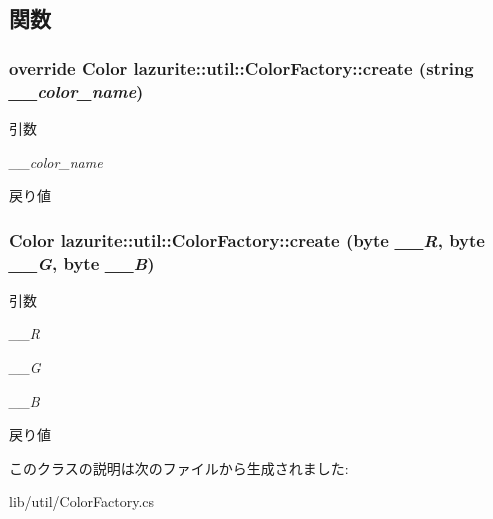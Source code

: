 \subsection{関数}
\hypertarget{classlazurite_1_1util_1_1_color_factory_a6c8331420df5f3442b357ab5c8f0ec99}{
\subsubsection[{create}]{\setlength{\rightskip}{0pt plus 5cm}override Color lazurite::util::ColorFactory::create (string {\em \_\-\_\-color\_\-name})}}
\label{classlazurite_1_1util_1_1_color_factory_a6c8331420df5f3442b357ab5c8f0ec99}

\begin{DoxyParams}{引数}
\item[{\em \_\-\_\-color\_\-name}]\end{DoxyParams}
\begin{DoxyReturn}{戻り値}

\end{DoxyReturn}
\hypertarget{classlazurite_1_1util_1_1_color_factory_af81bc6312ceffdaad936514513b7718c}{
\subsubsection[{create}]{\setlength{\rightskip}{0pt plus 5cm}Color lazurite::util::ColorFactory::create (byte {\em \_\-\_\-R}, \/  byte {\em \_\-\_\-G}, \/  byte {\em \_\-\_\-B})}}
\label{classlazurite_1_1util_1_1_color_factory_af81bc6312ceffdaad936514513b7718c}

\begin{DoxyParams}{引数}
\item[{\em \_\-\_\-R}]\item[{\em \_\-\_\-G}]\item[{\em \_\-\_\-B}]\end{DoxyParams}
\begin{DoxyReturn}{戻り値}

\end{DoxyReturn}


このクラスの説明は次のファイルから生成されました:\begin{DoxyCompactItemize}
\item 
lib/util/ColorFactory.cs\end{DoxyCompactItemize}

